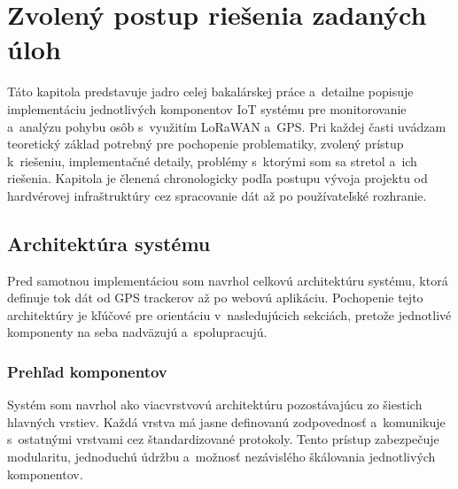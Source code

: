 \chapter{Zvolený postup riešenia zadaných úloh}
\label{sec:Reseni}


Táto kapitola predstavuje jadro celej bakalárskej práce a~detailne popisuje implementáciu jednotlivých komponentov IoT systému pre monitorovanie a~analýzu pohybu osôb s~využitím LoRaWAN a~GPS. Pri každej časti uvádzam teoretický základ potrebný pre pochopenie problematiky, zvolený prístup k~riešeniu, implementačné detaily, problémy s~ktorými som sa stretol a~ich riešenia. Kapitola je členená chronologicky podľa postupu vývoja projektu od hardvérovej infraštruktúry cez spracovanie dát až po používateľské rozhranie.


\section{Architektúra systému}
\label{sec:Architektura}

Pred samotnou implementáciou som navrhol celkovú architektúru systému, ktorá definuje tok dát od GPS trackerov až po webovú aplikáciu. Pochopenie tejto architektúry je kľúčové pre orientáciu v~nasledujúcich sekciách, pretože jednotlivé komponenty na seba nadväzujú a~spolupracujú.

\subsection{Prehľad komponentov}
\label{sec:PrehladKomponent}

Systém som navrhol ako viacvrstvovú architektúru pozostávajúcu zo šiestich hlavných vrstiev. Každá vrstva má jasne definovanú zodpovednosť a~komunikuje s~ostatnými vrstvami cez štandardizované protokoly. Tento prístup zabezpečuje modularitu, jednoduchú údržbu a~možnosť nezávislého škálovania jednotlivých komponentov.

